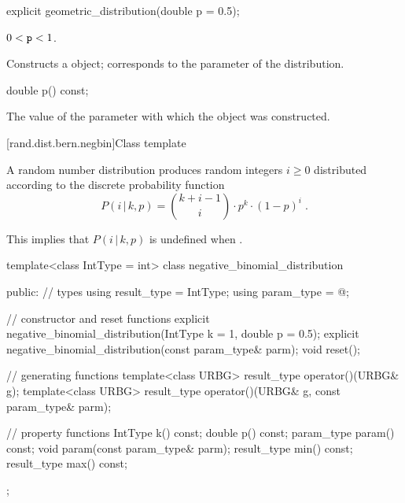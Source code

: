 %
\begin{itemdecl}
explicit geometric_distribution(double p = 0.5);
\end{itemdecl}

\begin{itemdescr}
\pnum\requires
 $0 < \texttt{p} < 1$.

\pnum\effects Constructs a  object;
 corresponds to the parameter of the distribution.
\end{itemdescr}

%
\begin{itemdecl}
double p() const;
\end{itemdecl}

\begin{itemdescr}
\pnum\returns The value of the  parameter
 with which the object was constructed.
\end{itemdescr}


[rand.dist.bern.negbin]{Class template }
%
%

\pnum
A  random number distribution
produces random integers $i \geq 0$
distributed according to
the discrete probability function
%
%
\[%
 P(i\,|\,k,p)
      = \binom{k+i-1}{i} \cdot p^k \cdot (1-p)^i
\; \mbox{.}
\]
\begin{note}
This implies that $P(i\,|\,k,p)$ is undefined when .
\end{note}

%
\begin{codeblock}
template<class IntType = int>
 class negative_binomial_distribution
{
public:
 // types
 using result_type = IntType;
 using param_type  = @\unspec@;

 // constructor and reset functions
 explicit negative_binomial_distribution(IntType k = 1, double p = 0.5);
 explicit negative_binomial_distribution(const param_type& parm);
 void reset();

 // generating functions
 template<class URBG>
   result_type operator()(URBG& g);
 template<class URBG>
   result_type operator()(URBG& g, const param_type& parm);

 // property functions
 IntType k() const;
 double p() const;
 param_type param() const;
 void param(const param_type& parm);
 result_type min() const;
 result_type max() const;
};
\end{codeblock}


